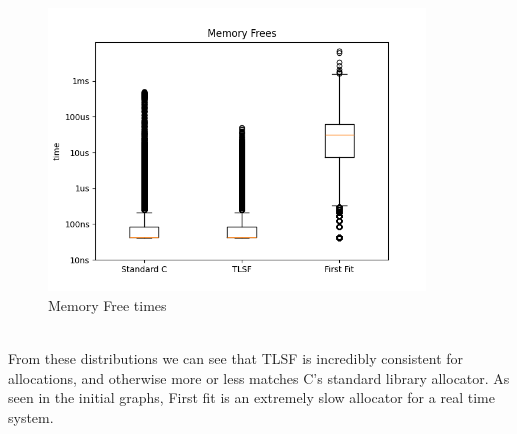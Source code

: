 \documentclass{article}
\begin{document}
\begin{figure}[h]
	\centering
	\includegraphics[width=10cm]{boxplots_free}
	\captionsetup{width=10cm}
	\caption{Memory Free times}
\end{figure}
\\
From these distributions we can see that TLSF is incredibly consistent for allocations, and otherwise more or less matches C's standard library allocator. As seen in the initial graphs, First fit is an extremely slow allocator for a real time system.
\end{document}
